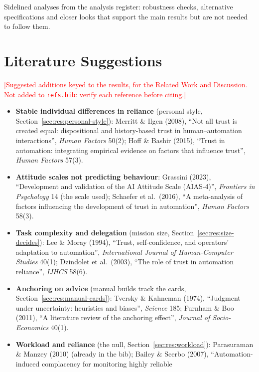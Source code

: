\documentclass[10pt]{article}
\theoremstyle{definition}
\newcommand{\todo}[1]{\textcolor{red}{[#1]}}
\begin{document}
Sidelined analyses from the analysis register: robustness checks, alternative specifications and closer looks that
support the main results but are not needed to follow them.



\clearpage
\section{Literature Suggestions}\label{app:lit}

\todo{Suggested additions keyed to the results, for the Related Work and Discussion. Not added to \texttt{refs.bib}:
verify each reference before citing.}

\begin{itemize}[itemsep=2pt]
  \item \textbf{Stable individual differences in reliance} (personal style, Section~\ref{sec:res:personal-style}):
    Merritt \& Ilgen (2008), ``Not all trust is created equal: dispositional and history-based trust in
    human--automation interactions'', \emph{Human Factors} 50(2); Hoff \& Bashir (2015), ``Trust in automation:
    integrating empirical evidence on factors that influence trust'', \emph{Human Factors} 57(3).
  \item \textbf{Attitude scales not predicting behaviour}: Grassini (2023), ``Development and validation of the AI
    Attitude Scale (AIAS-4)'', \emph{Frontiers in Psychology} 14 (the scale used); Schaefer et al.\ (2016), ``A
    meta-analysis of factors influencing the development of trust in automation'', \emph{Human Factors} 58(3).
  \item \textbf{Task complexity and delegation} (mission size, Section~\ref{sec:res:size-decides}): Lee \& Moray
    (1994), ``Trust, self-confidence, and operators' adaptation to automation'', \emph{International Journal of
    Human-Computer Studies} 40(1); Dzindolet et al.\ (2003), ``The role of trust in automation reliance'',
    \emph{IJHCS} 58(6).
  \item \textbf{Anchoring on advice} (manual builds track the cards, Section~\ref{sec:res:manual-cards}):
    Tversky \& Kahneman (1974), ``Judgment under uncertainty: heuristics and biases'', \emph{Science} 185;
    Furnham \& Boo (2011), ``A literature review of the anchoring effect'', \emph{Journal of Socio-Economics} 40(1).
  \item \textbf{Workload and reliance} (the null, Section~\ref{sec:res:workload}): Parasuraman \& Manzey (2010)
    (already in the bib); Bailey \& Scerbo (2007), ``Automation-induced complacency for monitoring highly reliable

\end{itemize}
\end{document}

